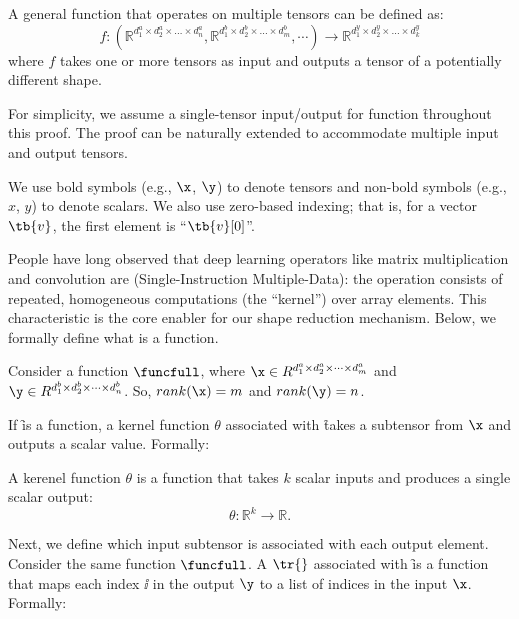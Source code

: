 \begin{definition}[Functions]
A general function that operates on multiple tensors can be defined as:
\begin{equation}
f: (\mathbb{R}^{d_1^a \times d_2^a \times \dots \times d_n^a}, \mathbb{R}^{d_1^b \times d_2^b \times \dots \times d_m^b}, \cdots) \to \mathbb{R}^{d_1^y \times d_2^y \times \dots \times d_k^y}
\end{equation}
where $f$ takes one or more tensors as input and outputs a tensor of a potentially different shape.
\end{definition}


For simplicity, we assume a single-tensor input/output for function \f throughout this
proof. The proof can be naturally extended to accommodate multiple input
and output tensors.

We use bold symbols (e.g., $\x$, $\y$) to denote tensors and non-bold symbols (e.g., $x$, $y$) to denote scalars.
We also use zero-based indexing; that is, for a vector $\tb{v}$, the first element is ``$\tb{v}[0]$''.

People have long observed that deep learning operators like matrix multiplication
and convolution are \simd{} (Single-Instruction Multiple-Data):
the operation consists of repeated, homogeneous computations (the ``kernel'') over array elements.
This \simd{} characteristic is the core enabler for our shape reduction mechanism.
Below, we formally define what is a \simd{} function.

Consider a function $\funcfull$, where $\x \in R^{d_1^a\times d_2^a \times \dots \times d_m^a}$
and $\y \in R^{d_1^b \times d_2^b \times \dots \times d_n^b}$.
So, $rank(\x)=m$ and $rank(\y)=n$.


If \f is a \simd{} function,
a kernel function $\theta$ associated with \f takes a subtensor from $\x$
and outputs a scalar value. Formally:

\begin{definition}[\CF{\kfunc}]
A kerenel function $\theta$ is a function that takes $k$ scalar inputs and produces a single scalar output:
\[
\theta: \mathbb{R}^{k} \to \mathbb{R}.
\]
\label{def:kernelfunc}
\end{definition}

Next, we define which input subtensor is associated with each output element.
%
Consider the same function $\funcfull$.
A \depmap $\tr{}$ associated with \f is a function that maps each index $\ii$ in the output $\y$
to a list of indices in the input $\x$. Formally:

